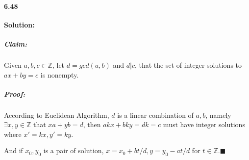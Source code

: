 \documentclass[11pt]{article}
\begin{document}
	\paragraph{6.48}\textbf{Solution:} 
		\subparagraph{Claim:} Given $a, b, c \in \mathbb{Z}$, let $d = gcd(a, b)$ and $d | c$, that the set of integer solutions to $ax + by = c$ is nonempty.
		\subparagraph{Proof:} According to Euclidean Algorithm, $d$ is a linear combination of $a, b$, namely $\exists x, y \in \mathbb{Z}$ that $xa + yb = d$, then $akx + bky = dk = c$ must have integer solutions where $x' = kx, y' = ky$.
		
		And if $x_0, y_0$ is a pair of solution,  $x = x_0 + bt/d, y = y_0 - at/d$ for $t \in \mathbb{Z}$.$\blacksquare$ 
\end{document}
